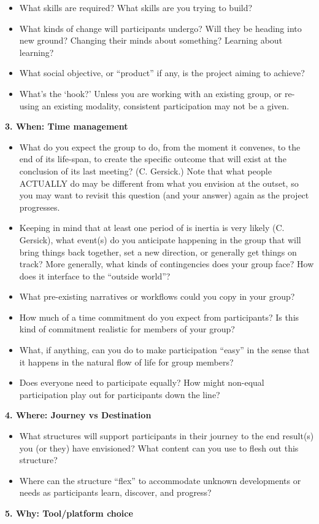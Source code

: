 \begin{itemize}
\item
  What skills are required? What skills are you trying to build?
\item
  What kinds of change will participants undergo? Will they be heading
  into new ground? Changing their minds about something? Learning about
  learning?
\item
  What social objective, or ``product'' if any, is the project aiming to
  achieve?
\item
  What's the `hook?' Unless you are working with an existing group, or
  re-using an existing modality, consistent participation may not be a
  given.
\end{itemize}
\textbf{3. When: Time management}

\begin{itemize}
\item
  What do you expect the group to do, from the moment it convenes, to
  the end of its life-span, to create the specific outcome that will
  exist at the conclusion of its last meeting? (C. Gersick.) Note that
  what people ACTUALLY do may be different from what you envision at the
  outset, so you may want to revisit this question (and your answer)
  again as the project progresses.
\item
  Keeping in mind that at least one period of is inertia is very likely
  (C. Gersick), what event(s) do you anticipate happening in the group
  that will bring things back together, set a new direction, or
  generally get things on track? More generally, what kinds of
  contingencies does your group face? How does it interface to the
  ``outside world''?
\item
  What pre-existing narratives or workflows could you copy in your
  group?
\item
  How much of a time commitment do you expect from participants? Is this
  kind of commitment realistic for members of your group?
\item
  What, if anything, can you do to make participation ``easy'' in the
  sense that it happens in the natural flow of life for group members?
\item
  Does everyone need to participate equally? How might non-equal
  participation play out for participants down the line?
\end{itemize}
\textbf{4. Where: Journey vs Destination}

\begin{itemize}
\item
  What structures will support participants in their journey to the end
  result(s) you (or they) have envisioned? What content can you use to
  flesh out this structure?
\item
  Where can the structure ``flex'' to accommodate unknown developments
  or needs as participants learn, discover, and progress?
\end{itemize}
\textbf{5. Why: Tool/platform choice}

